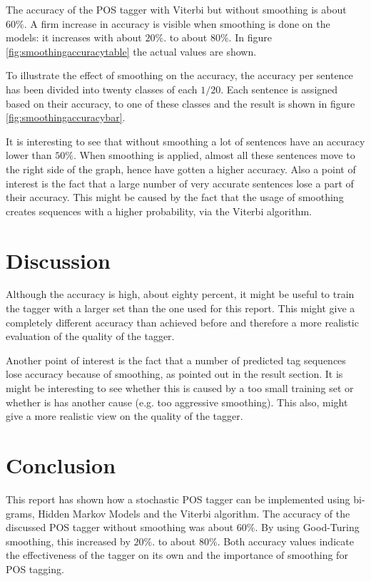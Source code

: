 \documentclass[titlepage,a4paper, 10pt]{article}
\begin{document}
The accuracy of the POS tagger with Viterbi but without smoothing is about $60\%$. A firm increase in accuracy is visible when smoothing is done on the models: it increases with about $20\%.$ to about $80\%$. In figure \ref{fig:smoothingaccuracytable} the actual values are shown.

To illustrate the effect of smoothing on the accuracy, the accuracy per sentence has been divided into twenty classes of each $1/20$.
Each sentence is assigned based on their accuracy, to one of these classes and the result is shown in figure \ref{fig:smoothingaccuracybar}.

It is interesting to see that without smoothing a lot of sentences have an accuracy lower than $50\%$.
When smoothing is applied, almost all these sentences move to the right side of the graph, hence have gotten a higher accuracy.
Also a point of interest is the fact that a large number of very accurate sentences lose a part of their accuracy.
This might be caused by the fact that the usage of smoothing creates sequences with a higher probability, via the Viterbi algorithm.

\section{Discussion}
Although the accuracy is high, about eighty percent, it might be useful to train the tagger with a larger set than the one used for this report.
This might give a completely different accuracy than achieved before and therefore a more realistic evaluation of the quality of the tagger.

Another point of interest is the fact that a number of predicted tag sequences lose accuracy because of smoothing, as pointed out in the result section.
It is might be interesting to see whether this is caused by a too small training set or whether is has another cause (e.g. too aggressive smoothing).
This also, might give a more realistic view on the quality of the tagger.

\section{Conclusion}

This report has shown how a stochastic POS tagger can be implemented using bi-grams, Hidden Markov Models and the Viterbi algorithm.
The accuracy of the discussed POS tagger without smoothing was about $60\%$.
By using Good-Turing smoothing, this increased by $20\%.$ to about $80\%$.
Both accuracy values indicate the effectiveness of the tagger on its own and the importance of smoothing for POS tagging.
\end{document}
